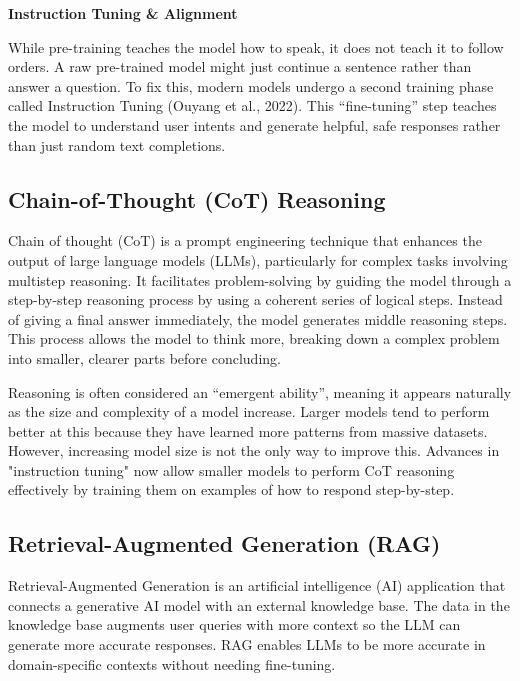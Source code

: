 \textbf{Instruction Tuning \& Alignment}

While pre-training teaches the model how to speak, it does not teach it to follow orders. A raw pre-trained model might just continue a sentence rather than answer a question. To fix this, modern models undergo a second training phase called Instruction Tuning (Ouyang et al., 2022). This ``fine-tuning'' step teaches the model to understand user intents and generate helpful, safe responses rather than just random text completions.

\subsection{Chain-of-Thought (CoT) Reasoning}
Chain of thought (CoT) \cite{CoT} is a prompt engineering technique that enhances the output of large language models (LLMs), particularly for complex tasks involving multistep reasoning. It facilitates problem-solving by guiding the model through a step-by-step reasoning process by using a coherent series of logical steps. Instead of giving a final answer immediately, the model generates middle reasoning steps. This process allows the model to think more, breaking down a complex problem into smaller, clearer parts before concluding.

Reasoning is often considered an ``emergent ability'', meaning it appears naturally as the size and complexity of a model increase. Larger models tend to perform better at this because they have learned more patterns from massive datasets. However, increasing model size is not the only way to improve this. Advances in "instruction tuning" now allow smaller models to perform CoT reasoning effectively by training them on examples of how to respond step-by-step.

\subsection{Retrieval-Augmented Generation (RAG)}
Retrieval-Augmented Generation \cite{RAG} is an artificial intelligence (AI) application that connects a generative AI model with an external knowledge base. The data in the knowledge base augments user queries with more context so the LLM can generate more accurate responses. RAG enables LLMs to be more accurate in domain-specific contexts without needing fine-tuning.


